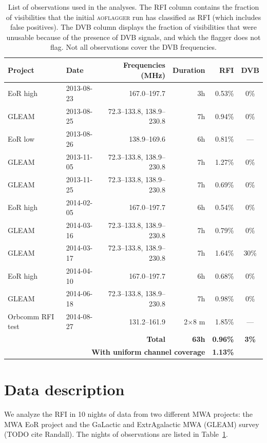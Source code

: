 \documentclass{pasa}
\begin{document}
\begin{table}
\caption{List of observations used in the analyses. The RFI column contains the fraction of visibilities that the initial \textsc{aoflagger} run has classified as RFI (which includes false positives). The DVB column displays the fraction of visibilities that were unusable because of the presence of DVB signals, and which the flagger does not flag. Not all observations cover the DVB frequencies. }\label{tbl:obs-list}
\begin{center}%
\begin{tabular}{|l|l|r|r|r|c|}
\hline
\textbf{Project} &\textbf{Date} & \textbf{Frequencies (MHz)} & \textbf{Duration} & RFI & DVB \\
\hline
EoR high& 2013-08-23 & 167.0--197.7              & 3h & 0.53\% & 0\% \\
GLEAM & 2013-08-25 & 72.3--133.8, 138.9--230.8 & 7h & 0.94\% & 0\% \\
EoR low& 2013-08-26 & 138.9--169.6              & 6h & 0.81\% & ---\\
GLEAM & 2013-11-05 & 72.3--133.8, 138.9--230.8 & 7h & 1.27\% & 0\% \\
GLEAM & 2013-11-25 & 72.3--133.8, 138.9--230.8 & 7h & 0.69\% & 0\% \\
EoR high& 2014-02-05 & 167.0--197.7              & 6h & 0.54\% & 0\%\\
GLEAM & 2014-03-16 & 72.3--133.8, 138.9--230.8 & 7h & 0.79\% & 0\% \\
GLEAM & 2014-03-17 & 72.3--133.8, 138.9--230.8 & 7h & 1.64\% & 30\% \\
EoR high& 2014-04-10 & 167.0--197.7              & 6h & 0.68\% & 0\%\\
GLEAM & 2014-06-18 & 72.3--133.8, 138.9--230.8 & 7h & 0.98\% & 0\% \\
Orbcomm RFI test&2014-08-27& 131.2--161.9     & 2$\times$8 m& 1.85\% & --- \\
\hline
\multicolumn{3}{|r|}{\textbf{Total}} & \textbf{63h} & \textbf{0.96\%} & \textbf{3\%}\\
\hline
\multicolumn{4}{|r|}{\textbf{With uniform channel coverage}} & \textbf{1.13\%} & \\
\hline
\end{tabular}
\end{center}
\end{table}

\section{Data description}
We analyze the RFI in 10 nights of data from two different MWA projects: the MWA EoR project \citep{bowman-science-with-the-mwa-2013} and the GaLactic and ExtrAgalactic MWA (GLEAM) survey (TODO cite Randall). The nights of observations are listed in Table~\ref{tbl:obs-list}.
\end{document}
